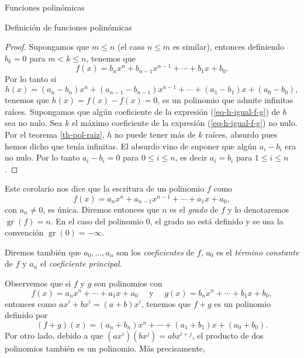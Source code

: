 \documentclass[a4paper,12pt,twoside,spanish,reqno]{amsbook}
\theoremstyle{definition}
\theoremstyle{remark}
\begin{document}
\begin{chapter}{Funciones polinómicas}
\begin{section}{Definición de funciones polinómicas}
\begin{proof}
        Supongamos que $m \le n$ (el caso $n \le m$ es similar), entonces definiendo $b_k=0$ para $m < k \le n$, tenemos que
        \begin{equation*}
        f(x) = b_nx^n + b_{n-1}x^{n-1}+\cdots + b_1x +b_0.
        \end{equation*}
        Por lo tanto si 
        \begin{equation}\label{eq-h-igual-f-g}
            h(x) = (a_n- b_n)x^n + (a_{n-1}-b_{n-1})x^{n-1}+\cdots + (a_{1}-b_{1})x +(a_{0}-b_{0}), 
        \end{equation}
        tenemos  que $h(x)= f(x)-f(x)=0$,  es un polinomio que admite infinitas raíces. 
        Supongamos  que algún coeficiente de la expresión (\ref{eq-h-igual-f-g}) de $h$ sea no nulo. Sea $k$  el máximo coeficiente de la expresión (\ref{eq-h-igual-f-g}) no nulo. Por el teorema   \ref{th-pol-raiz}, $h$ no  puede tener más de $k$ raíces, absurdo pues hemos dicho que tenía infinitas. El absurdo vino de suponer que algún $a_i-b_i$ era no nulo. Por lo tanto $a_i -b_i=0$ para $0 \le i \le n$,  es decir $a_i=b_i$ para $1 \le i \le n$. 
        
        
    \end{proof}

    Este corolario nos dice que la escritura de un polinomio $f$ como 
    \begin{equation*}
    f(x) = a_nx^n + a_{n-1}x^{n-1}+\cdots + a_1x +a_0,
    \end{equation*}
    con $a_n \ne 0$, es única. Diremos entonces que $n$ es el  \textit{grado} de $f$ y lo denotaremos $\operatorname{gr}(f)=n$. En  el caso del polinomio 0, el grado no está definido y se usa la convención $\operatorname{gr}(0)=-\infty$. 
    
    Diremos también que  $a_0,\ldots,a_n$ son los \textit{coeficientes} de $f$, $a_0$ es el \textit{término constante} de $f$ y $a_n$  el \textit{coeficiente principal.} 

    Observemos que si $f$ y $g$ son polinomios con   
    \begin{equation*}
    f(x) = a_nx^n + \cdots + a_1x +a_0 \quad\text{ y } \quad g(x) = b_nx^n +\cdots + b_1x +b_0,
    \end{equation*}
    entonces como $ax^i + b x^i = (a+b)x^i$, tenemos que $f+g$ es un polinomio definido por 
    \begin{equation*}
    (f + g)(x) = (a_n+b_n)x^n + \cdots + (a_1+b_1)x +(a_0+b_0).
    \end{equation*}
    Por otro  lado,  debido  a que $(ax^i)(bx^j) = abx^{i+j}$, el producto de dos polinomios también es un polinomio. Más precisamente,
    

\end{section}
\end{chapter}
\end{document}
